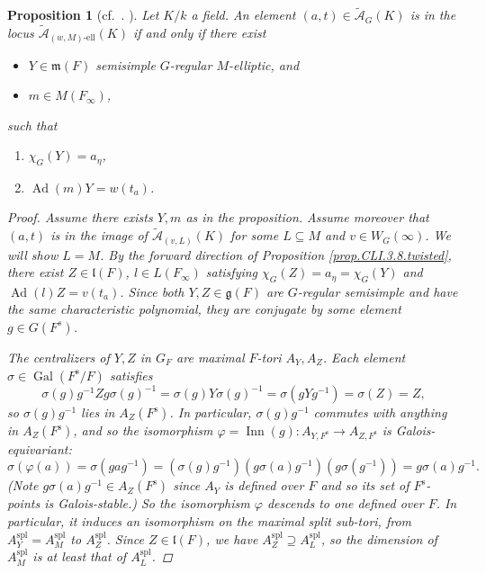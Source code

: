 \documentclass[openany]{amsbook}
\newtheorem{proposition}[theorem]{Proposition}
\theoremstyle{definition}
\theoremstyle{remark}
\numberwithin{equation}{section}
\newcommand{\cA}{\mathcal{A}}
\newcommand{\Gal}{\operatorname{Gal}}
\renewcommand{\phi}{\varphi}
\renewcommand{\-}{\operatorname{-}}
\newcommand{\Inn}{\operatorname{Inn}}
\newcommand{\on}[1]{\operatorname{#1}}
\newcommand{\fm}{\mathfrak{m}}
\newcommand{\el}{\text{-ell}}
\newcommand{\ctA}{\widetilde{\cA}}
\newcommand{\ctAt}[2]{\ctA_{(#1,#2)}}
\newcommand{\ctAe}[2]{\ctA_{(#1, #2)\el}}
\newcommand{\fl}{\mathfrak{l}}
\renewcommand{\fm}{\mathfrak{m}}
\renewcommand{\fg}{\mathfrak{g}}
\newcommand{\sep}{\text{s}}
\newcommand{\spl}{\mathrm{spl}}
\begin{document}
\begin{proposition}[{{{cf.\ \cite[Corollaire 3.9.2]{CLI}. }}}]\label{prop.CLI.3.9.twisted}
    Let $K/k$ a field. An element $(a,t) \in \ctA_G(K)$ is in the locus $\ctAe{w}{M}(K)$ if and only if there exist 
    \begin{itemize}
        \item $Y \in \fm(F)$ semisimple $G$-regular $M$-elliptic, and
        \item $m \in M(F_\infty)$,
    \end{itemize}
    such that 
    \begin{enumerate}[label=(\alph*)]
        \item $\chi_G(Y) = a_\eta$,
        \item $\on{Ad}(m)Y = w(t_a)$.
    \end{enumerate}
    \begin{proof}
    Assume there exists $Y,m$ as in the proposition. Assume moreover that $(a,t)$ is in the image of $\ctAt{v}{L}(K)$ for some $L \subseteq M$ and $v \in W_G(\infty)$. We will show $L = M$. By the forward direction of Proposition \ref{prop.CLI.3.8.twisted}, there exist $Z \in \fl(F)$, $l \in L(F_\infty)$ satisfying $\chi_G(Z) = a_\eta = \chi_G(Y)$ and $\on{Ad}(l) Z = v(t_a)$. Since both $Y,Z \in \fg(F)$ are $G$-regular semisimple and have the same characteristic polynomial, they are conjugate by some element $g \in G(F^s)$. 

    The centralizers of $Y,Z$ in $G_F$ are maximal $F$-tori $A_Y, A_Z$. Each element $\sigma \in \Gal(F^{\sep}/F)$ satisfies
        \[
            \sigma(g) g^{-1}Z g \sigma(g)^{-1} = \sigma(g) Y \sigma(g)^{-1} =\sigma(gYg^{-1}) = \sigma(Z) = Z,
        \]
        so $\sigma(g) g^{-1}$ lies in $A_Z(F^{\sep})$. In particular, $\sigma(g)g^{-1}$ commutes with anything in $A_Z(F^{\sep})$, and so the isomorphism $\phi = \Inn(g) : A_{Y, F^{\sep}} \to A_{Z, F^{\sep}}$ is Galois-equivariant:
        \[
            \sigma(\phi(a)) = \sigma(g a g^{-1}) = (\sigma(g) g^{-1})(g \sigma(a) g^{-1})(g \sigma(g^{-1})) = g \sigma(a) g^{-1}.
        \]
        (Note $g \sigma(a) g^{-1} \in A_Z(F^{\sep})$ since $A_Y$ is defined over $F$ and so its set of $F^{\sep}$-points is Galois-stable.) So the isomorphism $\phi$ descends to one defined over $F$. In particular, it induces an isomorphism on the maximal split sub-tori, from $A_Y^{\spl} = A_M^{\spl}$ to $A_Z^{\spl}$. Since $Z \in \fl(F)$, we have $A_Z^{\spl} \supseteq A_L^{\spl}$, so the dimension of $A_M^{\spl}$ is at least that of $A_L^{\spl}$. 


\end{proof}
\end{proposition}
\end{document}
